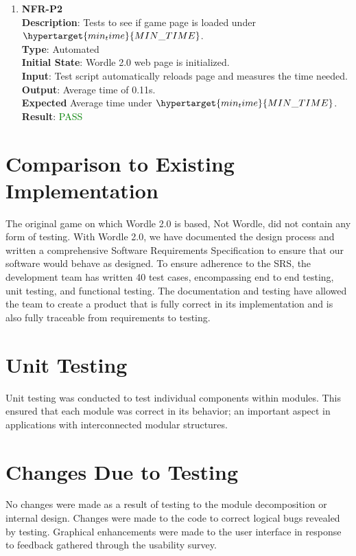 \documentclass[12pt, titlepage]{article}
\begin{document}
\begin{enumerate}
\item \textbf{NFR-P2\\}
\textbf{Description}: Tests to see if game page is loaded under  $\hypertarget{min_time}{MIN\_TIME}$.\\
\textbf{Type}: Automated\\
\textbf{Initial State}: Wordle 2.0 web page is initialized.\\
\textbf{Input}: Test script automatically reloads page and measures the time needed.\\
\textbf{Output}: Average time of 0.11s.\\
\textbf{Expected} Average time under $\hypertarget{min_time}{MIN\_TIME}$.\\
\textbf{Result}: \textcolor{green}{PASS}\\


\end{enumerate}
\newpage
\section{Comparison to Existing Implementation}	

The original game on which Wordle 2.0 is based, Not Wordle, did not contain any form of testing. With Wordle 2.0, we have documented the design process and written a comprehensive Software Requirements Specification to ensure that our software would behave as designed. To ensure adherence to the SRS, the development team has written 40 test cases, encompassing end to end testing, unit testing, and functional testing. The documentation and testing have allowed the team to create a product that is fully correct in its implementation and is also fully traceable from requirements to testing.

\section{Unit Testing}
Unit testing was conducted to test individual components within modules. This ensured that each module was correct in its behavior; an important aspect in applications with interconnected modular structures.  
\section{Changes Due to Testing}
No changes were made as a result of testing to the module decomposition or internal design. Changes were made to the code to correct logical bugs revealed by testing. Graphical enhancements were made to the user interface in response to feedback gathered through the usability survey.
\end{document}
